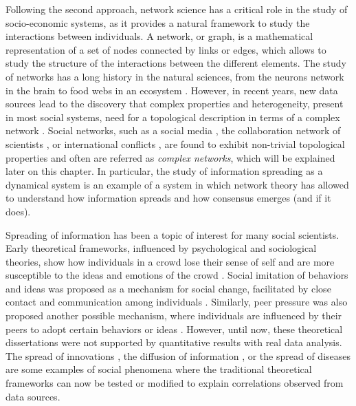 Following the second approach, network science has a critical role in the study of socio-economic systems, as it provides a natural framework to study the interactions between individuals. A network, or graph, is a mathematical representation of a set of nodes connected by links or edges, which allows to study the structure of the interactions between the different elements. The study of networks has a long history in the natural sciences, from the neurons network in the brain \cite{sporns-2004} to food webs in an ecosystem \cite{ings-2008, elith-2009, bastolla-2009}. However, in recent years, new data sources lead to the discovery that complex properties and heterogeneity, present in most social systems, need for a topological description in terms of a complex network \cite{newman-book, dorogovtsev2002evolution, boccaletti2006complex}. Social networks, such as a social media \cite{dunbar-2015}, the collaboration network of scientists \cite{newman-coll-2001,radicchi-2008}, or international conflicts \cite{hafnerburton-2009, diaz2023network}, are found to exhibit non-trivial topological properties and often are referred as \textit{complex networks}, which will be explained later on this chapter. In particular, the study of information spreading as a dynamical system is an example of a system in which network theory has allowed to understand how information spreads and how consensus emerges (and if it does).

Spreading of information has been a topic of interest for many social scientists. Early theoretical frameworks, influenced by psychological and sociological theories, show how individuals in a crowd lose their sense of self and are more susceptible to the ideas and emotions of the crowd \cite{le2023crowd}. Social imitation of behaviors and ideas was proposed as a mechanism for social change, facilitated by close contact and communication among individuals \cite{kanter-1971}. Similarly, peer pressure was also proposed another possible mechanism, where individuals are influenced by their peers to adopt certain behaviors or ideas \cite{granovetter-1978, brown-1986}. However, until now, these theoretical dissertations were not supported by quantitative results with real data analysis. The spread of innovations \cite{rogers2014}, the diffusion of information \cite{valente-1996}, or the spread of diseases \cite{anderson1991infectious} are some examples of social phenomena where the traditional theoretical frameworks can now be tested or modified to explain correlations observed from data sources.

